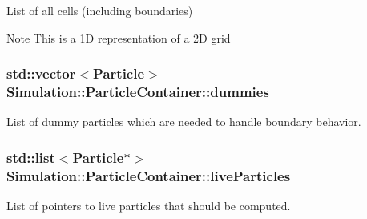 List of all cells (including boundaries) 

\begin{DoxyNote}{Note}
This is a 1\-D representation of a 2\-D grid 
\end{DoxyNote}
\hypertarget{classSimulation_1_1ParticleContainer_af7710cc9a30897b05c4dae5610562f2e}{
\subsubsection[{dummies}]{\setlength{\rightskip}{0pt plus 5cm}std\-::vector$<${\bf Particle}$>$ Simulation\-::\-Particle\-Container\-::dummies\hspace{0.3cm}{\ttfamily [private]}}}\label{classSimulation_1_1ParticleContainer_af7710cc9a30897b05c4dae5610562f2e}


List of dummy particles which are needed to handle boundary behavior. 

\hypertarget{classSimulation_1_1ParticleContainer_a851707b9ea1f91a934e7eda5e219b97d}{
\subsubsection[{live\-Particles}]{\setlength{\rightskip}{0pt plus 5cm}std\-::list$<${\bf Particle}$\ast$$>$ Simulation\-::\-Particle\-Container\-::live\-Particles\hspace{0.3cm}{\ttfamily [private]}}}\label{classSimulation_1_1ParticleContainer_a851707b9ea1f91a934e7eda5e219b97d}


List of pointers to live particles that should be computed. 

